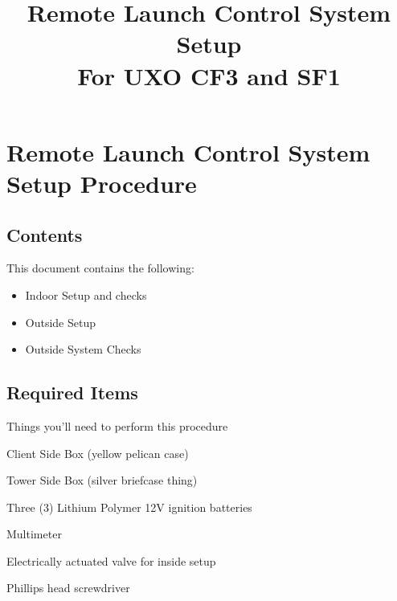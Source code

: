 

\title{
\Huge Remote Launch Control System Setup\\
\vspace{1cm}
\Large For UXO CF3 and SF1}








\section{Remote Launch Control System Setup Procedure}


\subsection{Contents}
This document contains the following:
\begin{itemize}
    \item Indoor Setup and checks
    \item Outside Setup
    \item Outside System Checks
\end{itemize}

\subsection{Required Items}
Things you'll need to perform this procedure
\begin{checklist}
    \item Client Side Box (yellow pelican case)
    \item Tower Side Box (silver briefcase thing)
    \item Three (3) Lithium Polymer 12V ignition batteries
    \item Multimeter
    \item Electrically actuated valve for inside setup
    \item Phillips head screwdriver
\end{checklist}


